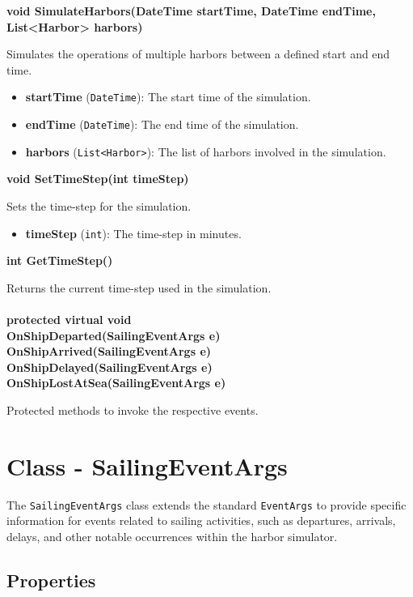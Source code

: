 \documentclass[12pt]{article}
\begin{document}
\textbf{void SimulateHarbors(DateTime startTime, DateTime endTime, List<Harbor> harbors)}

Simulates the operations of multiple harbors between a defined start and end time.

\begin{itemize}
    \item \textbf{startTime} (\texttt{DateTime}): The start time of the simulation.
    \item \textbf{endTime} (\texttt{DateTime}): The end time of the simulation.
    \item \textbf{harbors} (\texttt{List<Harbor>}): The list of harbors involved in the simulation.
\end{itemize}

\textbf{void SetTimeStep(int timeStep)}

Sets the time-step for the simulation.

\begin{itemize}
    \item \textbf{timeStep} (\texttt{int}): The time-step in minutes.
\end{itemize}

\textbf{int GetTimeStep()}

Returns the current time-step used in the simulation. \\ \\
\textbf{protected virtual void \\ OnShipDeparted(SailingEventArgs e) \\ OnShipArrived(SailingEventArgs e) \\ OnShipDelayed(SailingEventArgs e) \\ OnShipLostAtSea(SailingEventArgs e)}

Protected methods to invoke the respective events.

\newpage
\section*{Class - SailingEventArgs}

The \texttt{SailingEventArgs} class extends the standard \texttt{EventArgs} to provide specific information for events related to sailing activities, such as departures, arrivals, delays, and other notable occurrences within the harbor simulator.

\subsection*{Properties}
\end{document}
